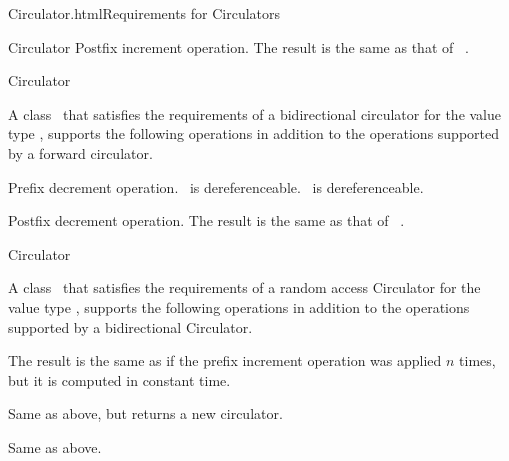 \begin{ccHtmlClassFile}{Circulator.html}{Requirements for Circulators}
\begin{ccClass}{Circulator}
{Postfix increment operation. The result is the same as that of 
 ~.}

\end{ccClass} 


\ccHtmlNoClassLinks
\ccHtmlNoClassIndex
\begin{ccClass}{Circulator}


\ccDefinition

A class \ccClassName\ that satisfies the requirements of a bidirectional
circulator for the value type , supports the following operations
in addition to the operations supported by a forward circulator.

\ccOperations

{Prefix decrement operation.
 \ccPrecond \ccVar\ is dereferenceable. \ccPostcond \ccVar\ 
  is dereferenceable.}

{Postfix decrement operation. The result is the same as that of 
 \ccStyle{Circulator tmp = c; --c; return tmp;}~.}

\end{ccClass} 


\ccHtmlNoClassLinks
\ccHtmlNoClassIndex
\begin{ccClass}{Circulator}

\label{sectionRandomAccessCirculatorRequ}

\ccDefinition

A class \ccClassName\ that satisfies the requirements of a random access
Circulator for the value type \ccStyle{T}, supports  the following operations
in addition to the operations supported by a bidirectional Circulator.


\ccOperations

{The result is the same as if the prefix increment operation 
 was applied $n$ times, but it is computed in constant time.}

{Same as above, but returns a new circulator.}

\renewcommand{\ccTagRmEigenClassName}{\ccTrue}
{Same as above.}
\renewcommand{\ccTagRmEigenClassName}{\ccFalse}


\end{ccClass}
\end{ccHtmlClassFile}
